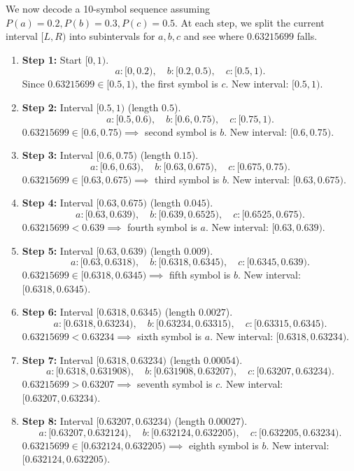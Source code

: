 \documentclass{article}
\begin{document}
We now decode a 10-symbol sequence assuming $P(a)=0.2, P(b)=0.3, P(c)=0.5$. At each step, we split the current interval $[L,R)$ into subintervals for $a, b, c$ and see where $0.63215699$ falls.

\begin{enumerate}
\item \textbf{Step 1:} Start $[0,1)$.  
  \[
    a:[0,0.2),\quad b:[0.2,0.5),\quad c:[0.5,1).
  \]
  Since $0.63215699 \in [0.5,1)$, the first symbol is $c$. 
  New interval: $[0.5,1)$.

\item \textbf{Step 2:} Interval $[0.5,1)$ (length $0.5$).  
  \[
    a:[0.5,0.6),\quad b:[0.6,0.75),\quad c:[0.75,1).
  \]
  $0.63215699 \in [0.6,0.75)\implies$ second symbol is $b$.  
  New interval: $[0.6,0.75)$.

\item \textbf{Step 3:} Interval $[0.6,0.75)$ (length $0.15$).  
  \[
    a:[0.6,0.63),\quad b:[0.63,0.675),\quad c:[0.675,0.75).
  \]
  $0.63215699 \in [0.63,0.675)\implies$ third symbol is $b$.  
  New interval: $[0.63,0.675)$.

\item \textbf{Step 4:} Interval $[0.63,0.675)$ (length $0.045$).  
  \[
    a:[0.63,0.639),\quad b:[0.639,0.6525),\quad c:[0.6525,0.675).
  \]
  $0.63215699 < 0.639\implies$ fourth symbol is $a$.  
  New interval: $[0.63,0.639)$.

\item \textbf{Step 5:} Interval $[0.63,0.639)$ (length $0.009$).  
  \[
    a:[0.63,0.6318),\quad b:[0.6318,0.6345),\quad c:[0.6345,0.639).
  \]
  $0.63215699 \in [0.6318,0.6345)\implies$ fifth symbol is $b$.  
  New interval: $[0.6318,0.6345)$.

\item \textbf{Step 6:} Interval $[0.6318,0.6345)$ (length $0.0027$).  
  \[
    a:[0.6318,0.63234),\quad b:[0.63234,0.63315),\quad c:[0.63315,0.6345).
  \]
  $0.63215699 < 0.63234\implies$ sixth symbol is $a$.  
  New interval: $[0.6318,0.63234)$.

\item \textbf{Step 7:} Interval $[0.6318,0.63234)$ (length $0.00054$).  
  \[
    a:[0.6318,0.631908),\quad b:[0.631908,0.63207),\quad c:[0.63207,0.63234).
  \]
  $0.63215699 > 0.63207\implies$ seventh symbol is $c$.  
  New interval: $[0.63207,0.63234)$.

\item \textbf{Step 8:} Interval $[0.63207,0.63234)$ (length $0.00027$).  
  \[
    a:[0.63207,0.632124),\quad b:[0.632124,0.632205),\quad c:[0.632205,0.63234).
  \]
  $0.63215699 \in [0.632124,0.632205)\implies$ eighth symbol is $b$.  
  New interval: $[0.632124,0.632205)$.


\end{enumerate}
\end{document}

